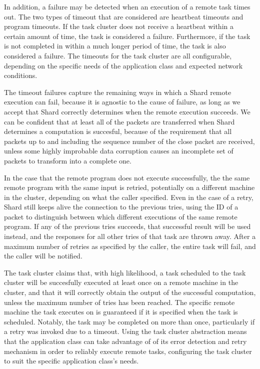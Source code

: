 \documentclass[twoside]{report}
\newcommand{\todoi}[1]{\todo[inline, color=blue!20]{TODO: {#1}}}
\begin{document}
In addition, a failure may be detected when an execution of a remote task times out.
The two types of timeout that are considered are heartbeat timeouts and program timeouts.
If the task cluster does not receive a heartbeat within a certain amount of time, the task is considered a failure.
Furthermore, if the task is not completed in within a much longer period of time, the task is also considered a failure.
The timeouts for the task cluster are all configurable, depending on the specific needs of the application class and expected network conditions.

The timeout failures capture the remaining ways in which a Shard remote execution can fail, because it is agnostic to the cause of failure, as long as we accept that Shard correctly determines when the remote execution succeeds.
We can be confident that at least all of the packets are transferred when Shard determines a computation is succesful, because of the requirement that all packets up to and including the sequence number of the close packet are received, unless some highly improbable data corruption causes an incomplete set of packets to transform into a complete one.

In the case that the remote program does not execute successfully, the the same remote program with the same input is retried, potentially on a different machine in the cluster, depending on what the caller specified.
Even in the case of a retry, Shard still keeps alive the connection to the previous tries, using the ID of a packet to distinguish between which different executions of the same remote program.
If any of the previous tries succeeds, that successful result will be used instead, and the responses for all other tries of that task are thrown away.
After a maximum number of retries as specified by the caller, the entire task will fail, and the caller will be notified.

\todoi{Implement and describe beta distribution task choosing}

The task cluster claims that, with high likelihood, a task scheduled to the task cluster will be succesfully executed at least once on a remote machine in the cluster, and that it will correctly obtain the output of the successful computation, unless the maximum number of tries has been reached.
The specific remote machine the task executes on is guaranteed if it is specified when the task is scheduled.
Notably, the task may be completed on more than once, particularly if a retry was invoked due to a timeout.
Using the task cluster abstraction means that the application class can take advantage of of its error detection and retry mechanism in order to reliably execute remote tasks, configuring the task cluster to suit the specific application class's needs.
\end{document}
